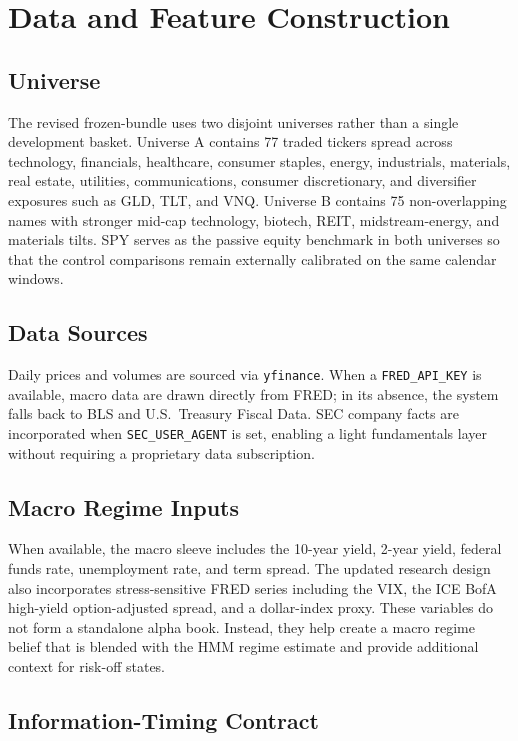 \documentclass[10pt,twocolumn]{article}
\begin{document}
\section{Data and Feature Construction}

\subsection{Universe}

The revised frozen-bundle uses two disjoint universes rather than a single
development basket. Universe A contains 77 traded tickers spread across
technology, financials, healthcare, consumer staples, energy, industrials,
materials, real estate, utilities, communications, consumer discretionary, and
diversifier exposures such as GLD, TLT, and VNQ. Universe B contains 75
non-overlapping names with stronger mid-cap technology, biotech, REIT,
midstream-energy, and materials tilts. SPY serves as the passive equity
benchmark in both universes so that the control comparisons remain externally
calibrated on the same calendar windows.

\subsection{Data Sources}

Daily prices and volumes are sourced via \texttt{yfinance}. When a
\texttt{FRED\_API\_KEY} is available, macro data are drawn directly from FRED;
in its absence, the system falls back to BLS and U.S.\ Treasury Fiscal Data.
SEC company facts are incorporated when \texttt{SEC\_USER\_AGENT} is set,
enabling a light fundamentals layer without requiring a proprietary data
subscription.

\subsection{Macro Regime Inputs}

When available, the macro sleeve includes the 10-year yield, 2-year yield,
federal funds rate, unemployment rate, and term spread. The updated research
design also incorporates stress-sensitive FRED series including the VIX, the
ICE BofA high-yield option-adjusted spread, and a dollar-index proxy. These
variables do not form a standalone alpha book. Instead, they help create a
macro regime belief that is blended with the HMM regime estimate and provide
additional context for risk-off states.

\subsection{Information-Timing Contract}
\end{document}
